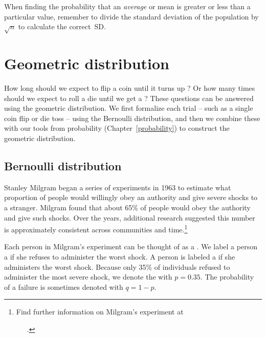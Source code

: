 \begin{tipBox}{
When finding the probability that an \emph{average} or mean is greater or less than a particular value, remember to divide the standard deviation of the population by $\sqrt{n}$ to calculate the correct~SD.}
\end{tipBox}


\section{Geometric distribution}
\label{geomDist}

How long should we expect to flip a coin until it turns up ? Or how many times should we expect to roll a die until we get a ? These questions can be answered using the geometric distribution. We first formalize each trial -- such as a single coin flip or die toss -- using the Bernoulli distribution, and then we combine these with our tools from probability (Chapter~\ref{probability}) to construct the geometric distribution.

\subsection{Bernoulli distribution}
\label{bernoulli}


Stanley Milgram began a series of experiments in 1963 to estimate what proportion of people would willingly obey an authority and give severe shocks to a stranger. Milgram found that about 65\% of people would obey the authority and give such shocks. Over the years, additional research suggested this number is approximately consistent across communities and time.\footnote{Find further information on Milgram's experiment at \par \ \ \hspace{0.2mm}\ .}

Each person in Milgram's experiment can be thought of as a . We label a person a  if she refuses to administer the worst shock. A person is labeled a  if she administers the worst shock. Because only 35\% of individuals refused to administer the most severe shock, we denote the  with $p=0.35$. The probability of a failure is sometimes denoted with $q=1-p$.

